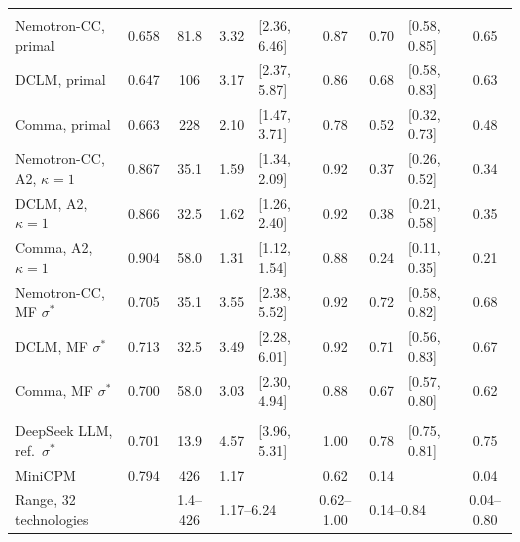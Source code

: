 \begin{table}[tp]
\begin{tabular*}{\textwidth}{@{\extracolsep{\fill}}lccr@{\,}lcr@{\,}lc@{}}
\addlinespace[2pt]
\multicolumn{9}{@{}l}{\textit{Marin ladders}} \\
\quad Nemotron-CC, primal & 0.658 & 81.8 & 3.32 & {\footnotesize [2.36, 6.46]} & 0.87 & 0.70 & {\footnotesize [0.58, 0.85]} & 0.65 \\
\quad DCLM, primal & 0.647 & 106 & 3.17 & {\footnotesize [2.37, 5.87]} & 0.86 & 0.68 & {\footnotesize [0.58, 0.83]} & 0.63 \\
\quad Comma, primal & 0.663 & 228 & 2.10 & {\footnotesize [1.47, 3.71]} & 0.78 & 0.52 & {\footnotesize [0.32, 0.73]} & 0.48 \\
\quad Nemotron-CC, A2, $\kappa=1$ & 0.867 & 35.1 & 1.59 & {\footnotesize [1.34, 2.09]} & 0.92 & 0.37 & {\footnotesize [0.26, 0.52]} & 0.34 \\
\quad DCLM, A2, $\kappa=1$ & 0.866 & 32.5 & 1.62 & {\footnotesize [1.26, 2.40]} & 0.92 & 0.38 & {\footnotesize [0.21, 0.58]} & 0.35 \\
\quad Comma, A2, $\kappa=1$ & 0.904 & 58.0 & 1.31 & {\footnotesize [1.12, 1.54]} & 0.88 & 0.24 & {\footnotesize [0.11, 0.35]} & 0.21 \\
\quad Nemotron-CC, MF $\sigma^*$ & 0.705 & 35.1 & 3.55 & {\footnotesize [2.38, 5.52]} & 0.92 & 0.72 & {\footnotesize [0.58, 0.82]} & 0.68 \\
\quad DCLM, MF $\sigma^*$ & 0.713 & 32.5 & 3.49 & {\footnotesize [2.28, 6.01]} & 0.92 & 0.71 & {\footnotesize [0.56, 0.83]} & 0.67 \\
\quad Comma, MF $\sigma^*$ & 0.700 & 58.0 & 3.03 & {\footnotesize [2.30, 4.94]} & 0.88 & 0.67 & {\footnotesize [0.57, 0.80]} & 0.62 \\
\addlinespace[2pt]
\multicolumn{9}{@{}l}{\textit{Published laws}} \\
\quad DeepSeek LLM, ref.\ $\sigma^*$ & 0.701 & 13.9 & 4.57 & {\footnotesize [3.96, 5.31]} & 1.00 & 0.78 & {\footnotesize [0.75, 0.81]} & 0.75 \\
\quad MiniCPM & 0.794 & 426 & 1.17 &  & 0.62 & 0.14 &  & 0.04 \\
\midrule
Range, 32 technologies & & 1.4--426 & \multicolumn{2}{l}{1.17--6.24} & 0.62--1.00 & \multicolumn{2}{l}{0.14--0.84} & 0.04--0.80 \\
\bottomrule
\end{tabular*}
\par\smallskip
\begin{tablenotes}

\end{tablenotes}
\end{table}
